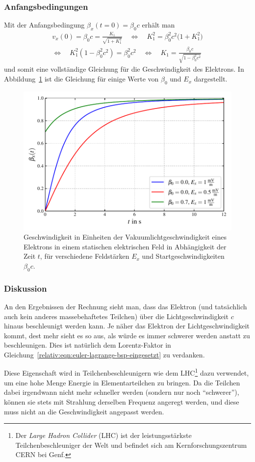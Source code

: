 \subsubsection{Anfangsbedingungen}
Mit der Anfangsbedingung \(\beta_x(t=0)=\beta_0 c\) erhält man
\begin{multline*}
    v_x(0) = \beta_0 c = \frac{K_1}{\sqrt{1+K_1^2}}\quad
    \Leftrightarrow\quad K_1^2 = \beta_0^2 c^2 \bigl(1+K_1^2\bigr)\\
    \Leftrightarrow\quad K_1^2 (1-\beta_0^2 c^2) = \beta_0^2 c^2\quad
    \Leftrightarrow\quad K_1 = \frac{\beta_0 c}{\sqrt{1-\beta_0^2 c^2}}
\end{multline*}
und somit eine vollständige Gleichung für die Geschwindigkeit des Elektrons.
In Abbildung~\ref{relativ:fig:elektron-em-feld} ist die Gleichung für einige
Werte von \(\beta_0\) und \(E_x\) dargestellt.
\begin{figure}
    \centering
    \includegraphics[width=0.8\linewidth]{papers/relativ/images/elektron_e-feld.pdf}
    \caption{Geschwindigkeit in Einheiten der Vakuumlichtgeschwindigkeit
    eines Elektrons in einem statischen elektrischen Feld in Abhängigkeit der Zeit \(t\),
    für verschiedene Feldstärken \(E_x\) und Startgeschwindigkeiten \(\beta_0 c\).
    \label{relativ:fig:elektron-em-feld}}
\end{figure}

\subsubsection{Diskussion}
An den Ergebnissen der Rechnung sieht man, dass das Elektron (und tatsächlich auch kein anderes
massebehaftetes Teilchen) über die Lichtgeschwindigkeit \(c\) hinaus beschleunigt werden kann.
Je näher das Elektron der Lichtgeschwindigkeit kommt, dest mehr sieht es so aus,
als würde es immer schwerer werden anstatt zu beschleunigen.
Dies ist natürlich dem Lorentz-Faktor in Gleichung~\eqref{relativ:eqn:euler-lagrange-bsp-eingesetzt}
zu verdanken.

Diese Eigenschaft wird in Teilchenbeschleunigern wie dem LHC\footnote{
Der \emph{Large Hadron Collider} (LHC) ist der leistungsstärkste
Teilchenbeschleuniger der Welt und befindet sich am
Kernforschungszentrum CERN bei Genf.
}
dazu verwendet, um eine hohe Menge Energie in Elementarteilchen zu bringen.
Da die Teilchen dabei irgendwann nicht mehr schneller werden
(sondern nur noch ``schwerer''),
können sie stets mit Strahlung derselben Frequenz angeregt werden, und
diese muss nicht an die Geschwindigkeit angepasst werden.
